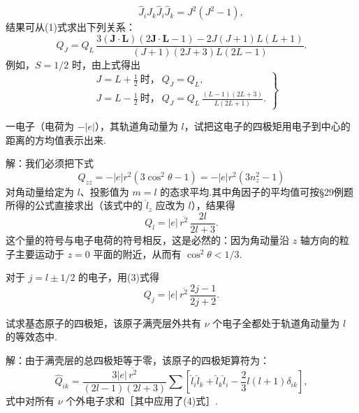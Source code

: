 \begin{xiti}
\begin{equation*}
  \qquad
  \hat{J}_i\hat{J}_k\hat{J}_i\hat{J}_k=J^{2}(J^{2}-1),
\end{equation*}
结果可从(1)式求出下列关系：
\begin{equation}
  Q_J=Q_L\,
  \frac{3(\boldsymbol{J}\cdot\boldsymbol{L})(2\boldsymbol{J}\cdot\boldsymbol{L}-1)
  -2J(J+1)L(L+1)}
  {(J+1)(2J+3)L(2L-1)}.
\end{equation}
例如，$S=1/2$ 时，由上式得出
\begin{equation}
\left.\begin{aligned}
  &J=L+\frac{1}{2}\ \text{时，}\ Q_J=Q_L,\\
  &J=L-\frac{1}{2}\ \text{时，}\ Q_J=Q_L\,\frac{(L-1)(2L+3)}{L(2L+1)}.
\end{aligned}\right\}
\end{equation}

\quad 一电子（电荷为 $-|e|$），其轨道角动量为 $l$，试把这电子的四极矩用电子到中心的距离的方均值表示出来.

解：我们必须把下式
\begin{equation*}
  Q_{zz}=-|e|r^{2}(3\cos^{2}\theta-1)=-|e|r^{2}(3n_z^{2}-1)
\end{equation*}
对角动量给定为 $l$、投影值为 $m=l$ 的态求平均.其中角因子的平均值可按§29例题所得的公式直接求出（该式中的 $\hat{l}_z$ 应改为 $l$），结果得
\begin{equation}
  Q_l=|e|\,\overline{r^{2}}\,\frac{2l}{2l+3}.
\end{equation}
这个量的符号与电子电荷的符号相反，这是必然的：因为角动量沿 $z$ 轴方向的粒子主要运动于 $z=0$ 平面的附近，从而有 $\cos^{2}\theta<1/3$.

对于 $j=l\pm1/2$ 的电子，用(3)式得
\begin{equation}
  Q_j=|e|\,\overline{r^{2}}\,\frac{2j-1}{2j+2}.
\end{equation}

\quad 试求基态原子的四极矩，该原子满壳层外共有 $\nu$ 个电子全都处于轨道角动量为 $l$ 的等效态中.

解：由于满壳层的总四极矩等于零，该原子的四极矩算符为：
\begin{equation*}
  \hat{Q}_{ik}=\frac{3|e|\,\overline{r^{2}}}{(2l-1)(2l+3)}
  \sum\left[\hat{l}_i\hat{l}_k+\hat{l}_k\hat{l}_i
  -\frac{2}{3}l(l+1)\delta_{ik}\right],
\end{equation*}
式中对所有 $\nu$ 个外电子求和［其中应用了(4)式］.


\end{xiti}
